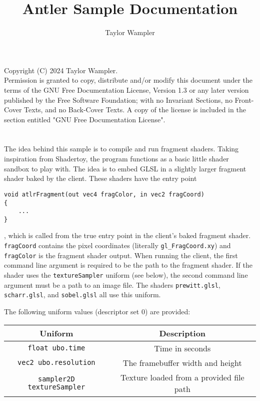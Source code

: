 \documentclass[a4paper,12pt]{book}
\title{Antler Sample Documentation}
\author{Taylor Wampler}
\date{ }
\begin{document}

\maketitle

Copyright (C) 2024 Taylor Wampler. \\

Permission is granted to copy, distribute and/or modify this document under the terms of the GNU Free Documentation License, Version 1.3 or any later version published by the Free Software Foundation; with no Invariant Sections, no Front-Cover Texts, and no Back-Cover Texts. A copy of the license is included in the section entitled "GNU Free Documentation License".

\tableofcontents
\markboth{}{}

\chapter*{}

The idea behind this sample is to compile and run fragment shaders. Taking inspiration from Shadertoy, the program functions as a basic little shader sandbox to play with. The idea is to embed GLSL in a slightly larger fragment shader baked by the client. These shaders have the entry point

\begin{verbatim}
void atlrFragment(out vec4 fragColor, in vec2 fragCoord)
{
	...
}
\end{verbatim}

, which is called from the true entry point in the client's baked fragment shader. \verb|fragCoord| contains the pixel coordinates (literally \verb|gl_FragCoord.xy|) and  \verb|fragColor| is the fragment shader output. When running the client, the first command line argument is required to be the path to the fragment shader. If the shader uses the \verb|textureSampler| uniform (see below), the second command line argument must be a path to an image file. The shaders \verb|prewitt.glsl|, \verb|scharr.glsl|, and \verb|sobel.glsl| all use this uniform. 

The following uniform values (descriptor set 0) are provided:

\begin{center}
\begin{tabular}{|c|c|}
\hline
Uniform & Description \\ \hline
\verb|float ubo.time|  & Time in seconds \\ \hline
\verb|vec2 ubo.resolution|   & The framebuffer width and height \\ \hline
\verb|sampler2D textureSampler| & Texture loaded from a provided file path \\ \hline

\end{tabular}
\end{center}
\end{document}
